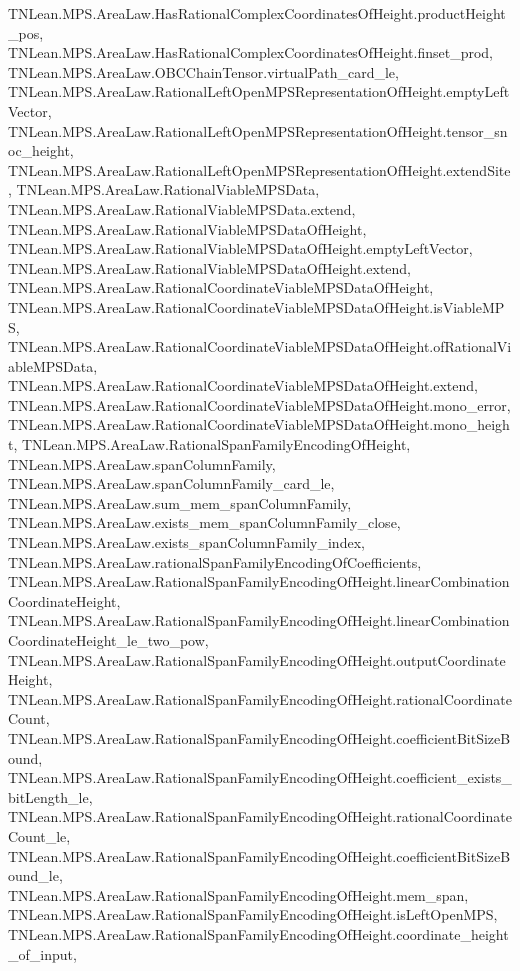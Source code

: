\begin{lemma}
{        TNLean.MPS.AreaLaw.HasRationalComplexCoordinatesOfHeight.productHeight_pos,
        TNLean.MPS.AreaLaw.HasRationalComplexCoordinatesOfHeight.finset_prod,
        TNLean.MPS.AreaLaw.OBCChainTensor.virtualPath_card_le,
        TNLean.MPS.AreaLaw.RationalLeftOpenMPSRepresentationOfHeight.emptyLeftVector,
        TNLean.MPS.AreaLaw.RationalLeftOpenMPSRepresentationOfHeight.tensor_snoc_height,
        TNLean.MPS.AreaLaw.RationalLeftOpenMPSRepresentationOfHeight.extendSite,
        TNLean.MPS.AreaLaw.RationalViableMPSData,
        TNLean.MPS.AreaLaw.RationalViableMPSData.extend,
        TNLean.MPS.AreaLaw.RationalViableMPSDataOfHeight,
        TNLean.MPS.AreaLaw.RationalViableMPSDataOfHeight.emptyLeftVector,
        TNLean.MPS.AreaLaw.RationalViableMPSDataOfHeight.extend,
        TNLean.MPS.AreaLaw.RationalCoordinateViableMPSDataOfHeight,
        TNLean.MPS.AreaLaw.RationalCoordinateViableMPSDataOfHeight.isViableMPS,
        TNLean.MPS.AreaLaw.RationalCoordinateViableMPSDataOfHeight.ofRationalViableMPSData,
        TNLean.MPS.AreaLaw.RationalCoordinateViableMPSDataOfHeight.extend,
        TNLean.MPS.AreaLaw.RationalCoordinateViableMPSDataOfHeight.mono_error,
        TNLean.MPS.AreaLaw.RationalCoordinateViableMPSDataOfHeight.mono_height,
        TNLean.MPS.AreaLaw.RationalSpanFamilyEncodingOfHeight,
        TNLean.MPS.AreaLaw.spanColumnFamily,
        TNLean.MPS.AreaLaw.spanColumnFamily_card_le,
        TNLean.MPS.AreaLaw.sum_mem_spanColumnFamily,
        TNLean.MPS.AreaLaw.exists_mem_spanColumnFamily_close,
        TNLean.MPS.AreaLaw.exists_spanColumnFamily_index,
        TNLean.MPS.AreaLaw.rationalSpanFamilyEncodingOfCoefficients,
        TNLean.MPS.AreaLaw.RationalSpanFamilyEncodingOfHeight.linearCombinationCoordinateHeight,
        TNLean.MPS.AreaLaw.RationalSpanFamilyEncodingOfHeight.linearCombinationCoordinateHeight_le_two_pow,
        TNLean.MPS.AreaLaw.RationalSpanFamilyEncodingOfHeight.outputCoordinateHeight,
        TNLean.MPS.AreaLaw.RationalSpanFamilyEncodingOfHeight.rationalCoordinateCount,
        TNLean.MPS.AreaLaw.RationalSpanFamilyEncodingOfHeight.coefficientBitSizeBound,
        TNLean.MPS.AreaLaw.RationalSpanFamilyEncodingOfHeight.coefficient_exists_bitLength_le,
        TNLean.MPS.AreaLaw.RationalSpanFamilyEncodingOfHeight.rationalCoordinateCount_le,
        TNLean.MPS.AreaLaw.RationalSpanFamilyEncodingOfHeight.coefficientBitSizeBound_le,
        TNLean.MPS.AreaLaw.RationalSpanFamilyEncodingOfHeight.mem_span,
        TNLean.MPS.AreaLaw.RationalSpanFamilyEncodingOfHeight.isLeftOpenMPS,
        TNLean.MPS.AreaLaw.RationalSpanFamilyEncodingOfHeight.coordinate_height_of_input,
}
\end{lemma}
